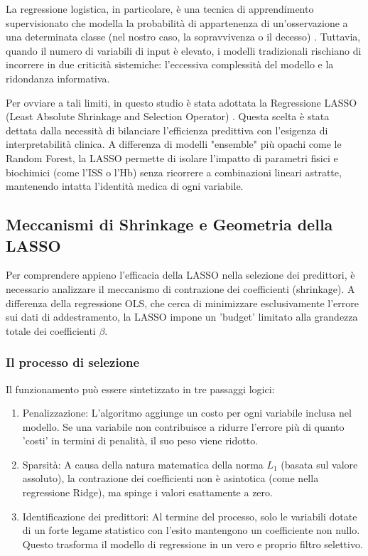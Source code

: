\documentclass[11pt, oneside, noexaminfo]{sapthesis}   	%
\begin{document}
La regressione logistica, in particolare, è una tecnica di apprendimento supervisionato che modella la probabilità di appartenenza di un'osservazione a una determinata classe (nel nostro caso, la sopravvivenza o il decesso) \cite{hosmer2013applied}. Tuttavia, quando il numero di variabili di input è elevato, i modelli tradizionali rischiano di incorrere in due criticità sistemiche: l'eccessiva complessità del modello e la ridondanza informativa.

Per ovviare a tali limiti, in questo studio è stata adottata la Regressione LASSO (Least Absolute Shrinkage and Selection Operator) \cite{hastie2009elements}. Questa scelta è stata dettata dalla necessità di bilanciare l'efficienza predittiva con l'esigenza di interpretabilità clinica. A differenza di modelli "ensemble" più opachi come le Random Forest, la LASSO permette di isolare l'impatto di parametri fisici e biochimici (come l'ISS o l'Hb) senza ricorrere a combinazioni lineari astratte, mantenendo intatta l'identità medica di ogni variabile.

\subsection{Meccanismi di Shrinkage e Geometria della LASSO}
Per comprendere appieno l'efficacia della LASSO nella selezione dei predittori, è necessario analizzare il meccanismo di contrazione dei coefficienti (shrinkage). A differenza della regressione OLS, che cerca di minimizzare esclusivamente l'errore sui dati di addestramento, la LASSO impone un 'budget' limitato alla grandezza totale dei coefficienti $\beta$.

\subsubsection{Il processo di selezione}
Il funzionamento può essere sintetizzato in tre passaggi logici:
\begin{enumerate}
\item Penalizzazione: L'algoritmo aggiunge un costo per ogni variabile inclusa nel modello. Se una variabile non contribuisce a ridurre l'errore più di quanto 'costi' in termini di penalità, il suo peso viene ridotto.

\item Sparsità: A causa della natura matematica della norma $L_1$ (basata sul valore assoluto), la contrazione dei coefficienti non è asintotica (come nella regressione Ridge), ma spinge i valori esattamente a zero.

\item Identificazione dei predittori: Al termine del processo, solo le variabili dotate di un forte legame statistico con l'esito mantengono un coefficiente non nullo. Questo trasforma il modello di regressione in un vero e proprio filtro selettivo.

\end{enumerate}
\end{document}
